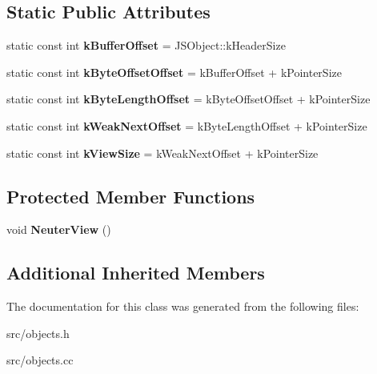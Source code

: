\subsection*{Static Public Attributes}
\begin{DoxyCompactItemize}
\item 
\hypertarget{classv8_1_1internal_1_1_j_s_array_buffer_view_a9bd38062f57df90d780be9f6b4ff6279}{}static const int {\bfseries k\+Buffer\+Offset} = J\+S\+Object\+::k\+Header\+Size\label{classv8_1_1internal_1_1_j_s_array_buffer_view_a9bd38062f57df90d780be9f6b4ff6279}

\item 
\hypertarget{classv8_1_1internal_1_1_j_s_array_buffer_view_a0cab5381d9130dc8f3fd3241b1895b9c}{}static const int {\bfseries k\+Byte\+Offset\+Offset} = k\+Buffer\+Offset + k\+Pointer\+Size\label{classv8_1_1internal_1_1_j_s_array_buffer_view_a0cab5381d9130dc8f3fd3241b1895b9c}

\item 
\hypertarget{classv8_1_1internal_1_1_j_s_array_buffer_view_a51ff86f5799df5e2dbdf3de80a23d951}{}static const int {\bfseries k\+Byte\+Length\+Offset} = k\+Byte\+Offset\+Offset + k\+Pointer\+Size\label{classv8_1_1internal_1_1_j_s_array_buffer_view_a51ff86f5799df5e2dbdf3de80a23d951}

\item 
\hypertarget{classv8_1_1internal_1_1_j_s_array_buffer_view_a03226bc7e6e8d810b6f272d4015bd9eb}{}static const int {\bfseries k\+Weak\+Next\+Offset} = k\+Byte\+Length\+Offset + k\+Pointer\+Size\label{classv8_1_1internal_1_1_j_s_array_buffer_view_a03226bc7e6e8d810b6f272d4015bd9eb}

\item 
\hypertarget{classv8_1_1internal_1_1_j_s_array_buffer_view_aa87af2114ca0ff678a62bcc5bbc2717e}{}static const int {\bfseries k\+View\+Size} = k\+Weak\+Next\+Offset + k\+Pointer\+Size\label{classv8_1_1internal_1_1_j_s_array_buffer_view_aa87af2114ca0ff678a62bcc5bbc2717e}

\end{DoxyCompactItemize}
\subsection*{Protected Member Functions}
\begin{DoxyCompactItemize}
\item 
\hypertarget{classv8_1_1internal_1_1_j_s_array_buffer_view_a2d84235c58c2c075cc94c6710be0b630}{}void {\bfseries Neuter\+View} ()\label{classv8_1_1internal_1_1_j_s_array_buffer_view_a2d84235c58c2c075cc94c6710be0b630}

\end{DoxyCompactItemize}
\subsection*{Additional Inherited Members}


The documentation for this class was generated from the following files\+:\begin{DoxyCompactItemize}
\item 
src/objects.\+h\item 
src/objects.\+cc\end{DoxyCompactItemize}
